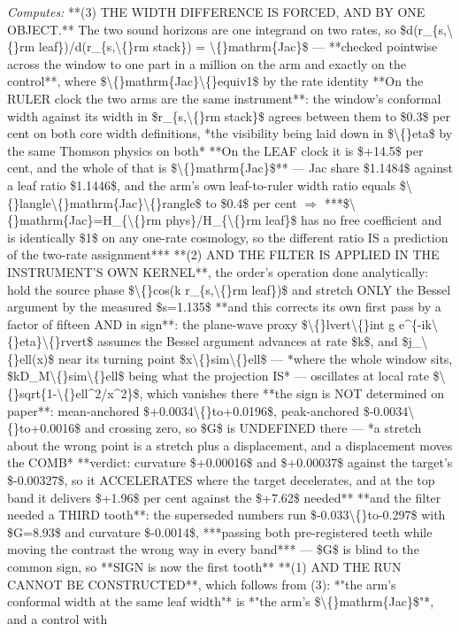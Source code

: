 \begin{description}
\emph{Computes:}  **(3) THE WIDTH DIFFERENCE IS FORCED, AND BY ONE OBJECT.** The two sound horizons are one integrand on two rates, so \$d(r\_\{s,\textbackslash\{\}rm leaf\})/d(r\_\{s,\textbackslash\{\}rm stack\}) = \textbackslash\{\}mathrm\{Jac\}\$ --- **checked pointwise across the window to one part in a million on the arm and exactly on the control**, where \$\textbackslash\{\}mathrm\{Jac\}\textbackslash\{\}equiv1\$ by the rate identity  **On the RULER clock the two arms are the same instrument**: the window's conformal width against its width in \$r\_\{s,\textbackslash\{\}rm stack\}\$ agrees between them to \$0.3\$ per cent on both core width definitions, *the visibility being laid down in \$\textbackslash\{\}eta\$ by the same Thomson physics on both*  **On the LEAF clock it is \$+14.5\$ per cent, and the whole of that is \$\textbackslash\{\}mathrm\{Jac\}\$** --- Jac share \$1.1484\$ against a leaf ratio \$1.1446\$, and the arm's own leaf-to-ruler width ratio equals \$\textbackslash\{\}langle\textbackslash\{\}mathrm\{Jac\}\textbackslash\{\}rangle\$ to \$0.4\$ per cent \ensuremath{\Rightarrow} ***\$\textbackslash\{\}mathrm\{Jac\}=H\_\{\textbackslash\{\}rm phys\}/H\_\{\textbackslash\{\}rm leaf\}\$ has no free coefficient and is identically \$1\$ on any one-rate cosmology, so the different ratio IS a prediction of the two-rate assignment***  **(2) AND THE FILTER IS APPLIED IN THE INSTRUMENT'S OWN KERNEL**, the order's operation done analytically: hold the source phase \$\textbackslash\{\}cos(k r\_\{s,\textbackslash\{\}rm leaf\})\$ and stretch ONLY the Bessel argument by the measured \$s=1.135\$  **and this corrects its own first pass by a factor of fifteen AND in sign**: the plane-wave proxy \$\textbackslash\{\}lvert\textbackslash\{\}int g e\textasciicircum{}\{-ik\textbackslash\{\}eta\}\textbackslash\{\}rvert\$ assumes the Bessel argument advances at rate \$k\$, and \$j\_\textbackslash\{\}ell(x)\$ near its turning point \$x\textbackslash\{\}sim\textbackslash\{\}ell\$ --- *where the whole window sits, \$kD\_M\textbackslash\{\}sim\textbackslash\{\}ell\$ being what the projection IS* --- oscillates at local rate \$\textbackslash\{\}sqrt\{1-\textbackslash\{\}ell\textasciicircum{}2/x\textasciicircum{}2\}\$, which vanishes there   **the sign is NOT determined on paper**: mean-anchored \$+0.0034\textbackslash\{\}to+0.0196\$, peak-anchored \$-0.0034\textbackslash\{\}to+0.0016\$ and crossing zero, so \$G\$ is UNDEFINED there --- *a stretch about the wrong point is a stretch plus a displacement, and a displacement moves the COMB*  **verdict: curvature \$+0.00016\$ and \$+0.00037\$ against the target's \$-0.00327\$, so it ACCELERATES where the target decelerates, and at the top band it delivers \$+1.96\$ per cent against the \$+7.62\$ needed**  **and the filter needed a THIRD tooth**: the superseded numbers run \$-0.033\textbackslash\{\}to-0.297\$ with \$G=8.93\$ and curvature \$-0.0014\$, ***passing both pre-registered teeth while moving the contrast the wrong way in every band*** --- \$G\$ is blind to the common sign, so **SIGN is now the first tooth**  **(1) AND THE RUN CANNOT BE CONSTRUCTED**, which follows from (3): *"the arm's conformal width at the same leaf width"* is *"the arm's \$\textbackslash\{\}mathrm\{Jac\}\$"*, and a control with 
\end{description}
